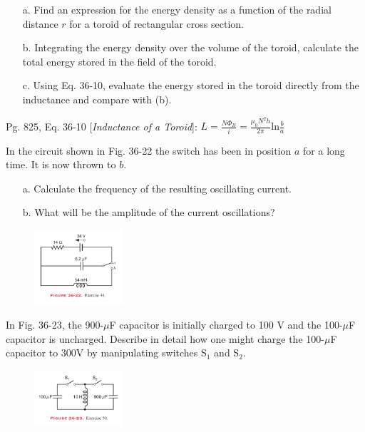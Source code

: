 \documentclass[11pt,letterpaper,boxed]{pset}
\begin{document}
    \begin{problem} [P36.9]
        \begin{enumerate}
            \item [a.] Find an expression for the energy density as a function of the radial distance $r$ for a toroid of rectangular cross section. 
            \item [b.] Integrating the energy density over the volume of the toroid, calculate the total energy stored in the field of the toroid. 
            \item [c.] Using Eq. 36-10, evaluate the energy stored in the toroid directly from the inductance and compare with (b).
        \end{enumerate}
        
        Pg. 825, Eq. 36-10 [\textit{Inductance of a Toroid}]: $L = \frac{N \Phi_B}{i} = \frac{\mu_0N^2h}{2\pi}\text{ln}\frac{b}{a}$
    \end{problem}
    \newpage
    
    \begin{problem} [E36.44]
        In the circuit shown in Fig. 36-22 the switch has been in position $a$ for a long time. It is now thrown to $b$. 
        
        \begin{enumerate}
            \item [a.] Calculate the frequency of the resulting oscillating current.
            \item [b.] What will be the amplitude of the current oscillations?
        \end{enumerate}
    \end{problem}
    
    \begin{figure} [ht]
        \includegraphics[width=125px]{HW9Images/E36-44.png}
        \label{fig:E36-44}
    \end{figure}
    \newpage
    
    \begin{problem}[E36.50]
        In Fig. 36-23, the 900-$\mu$F capacitor is initially charged to 100 V and the 100-$\mu$F capacitor is uncharged. Describe in detail how one might charge the 100-$\mu$F capacitor to 300V by manipulating switches S$_1$ and S$_2$.
    \end{problem}
    
    \begin{figure} [ht]
        \includegraphics[width=125px]{HW9Images/E36-50.png}
        \label{fig:E36-50}
    \end{figure}
\end{document}
